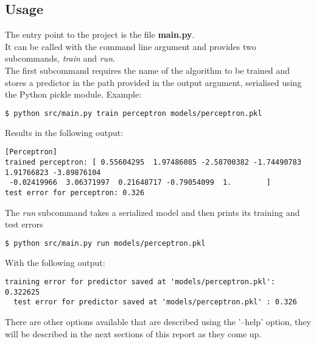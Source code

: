 \subsection{Usage}
The entry point to the project is the file \textbf{main.py}.\\ It can be called with the command line argument and provides two subcommands, \textit{train} and \textit{run}.\\
The first subcommand requires the name of the algorithm to be trained and stores a predictor in the path provided in the output argument, serialised using the Python pickle module.
Example:
\begin{lstlisting}[language=bash]
  $ python src/main.py train perceptron models/perceptron.pkl
\end{lstlisting}

Results in the following output:
\begin{lstlisting}[]
[Perceptron]
trained perceptron: [ 0.55604295  1.97486085 -2.58700382 -1.74490783  1.91766823 -3.89876104
 -0.02419966  3.06371997  0.21648717 -0.79054099  1.        ]
test error for perceptron: 0.326
\end{lstlisting}

The \textit{run} subcommand takes a serialized model and then prints its training and test errors

\begin{lstlisting}[language=bash]
  $ python src/main.py run models/perceptron.pkl
\end{lstlisting}

With the following output:
\begin{lstlisting}[]
  training error for predictor saved at 'models/perceptron.pkl': 0.322625
  test error for predictor saved at 'models/perceptron.pkl' : 0.326
\end{lstlisting}

There are other options available that are described using the '--help' option, they will be described in the next sections of this report as they come up.